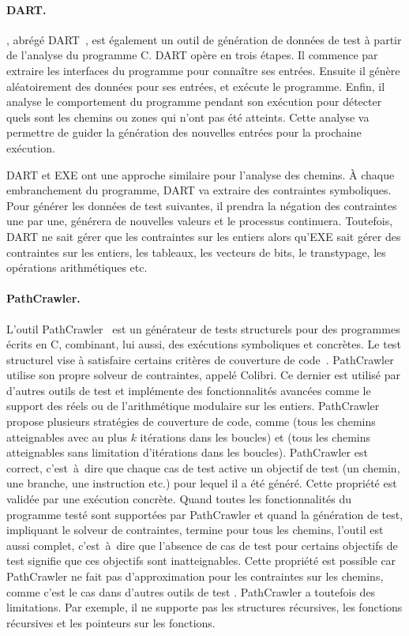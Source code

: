 \paragraph{DART.} , abrégé
DART~, est également un outil de génération de données de
test à partir de l'analyse du programme C. DART opère en trois étapes. Il
commence par extraire les interfaces du programme pour connaître ses entrées.
Ensuite il génère aléatoirement des données pour ses entrées, et exécute le
programme.  Enfin, il analyse le comportement du programme pendant son exécution
pour détecter quels sont les chemins ou zones qui n'ont pas été atteints. Cette
analyse va permettre de guider la génération des nouvelles entrées pour la
prochaine exécution.

DART et EXE ont une approche similaire pour l'analyse des chemins. À chaque
embranchement du programme, DART va extraire des contraintes symboliques. Pour
générer les données de test suivantes, il prendra la négation des contraintes
une par une, générera de nouvelles valeurs et le processus continuera.
Toutefois, DART ne sait gérer que les contraintes sur les entiers alors qu'EXE
sait gérer des contraintes sur les entiers, les tableaux, les vecteurs de bits,
le transtypage, les opérations arithmétiques etc.

\paragraph{PathCrawler.} L'outil PathCrawler~ est un générateur de tests structurels pour des programmes
écrits en C, combinant, lui aussi, des exécutions symboliques et concrètes. Le
test structurel vise à satisfaire certains critères de couverture de
code~.  PathCrawler utilise son propre
solveur de contraintes, appelé Colibri. Ce dernier est utilisé par d'autres
outils de test et implémente des fonctionnalités avancées comme le support des
réels ou de l'arithmétique modulaire sur les entiers. PathCrawler propose
plusieurs stratégies de couverture de code, comme 
(tous les chemins atteignables avec au plus $k$ itérations dans les boucles) et
 (tous les chemins atteignables sans limitation
d'itérations dans les boucles). PathCrawler est correct, c'est~à~dire que chaque
cas de test active un objectif de test (un chemin, une branche, une instruction
etc.) pour lequel il a été généré. Cette propriété est validée par une exécution
concrète. Quand toutes les fonctionnalités du programme testé sont supportées
par PathCrawler et quand la génération de test, impliquant le solveur de
contraintes, termine pour tous les chemins, l'outil est aussi complet,
c'est~à~dire que l'absence de cas de test pour certains objectifs de test
signifie que ces objectifs sont inatteignables. Cette propriété est possible car
PathCrawler ne fait pas d'approximation pour les contraintes sur les chemins,
comme c'est le cas dans d'autres outils de test .
PathCrawler a toutefois des limitations. Par exemple, il ne supporte pas les
structures récursives, les fonctions récursives et les pointeurs sur les
fonctions. \\


